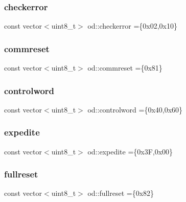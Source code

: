 \mbox{\label{namespaceod_ac4b980a10ae256ea019a767459b6ba9b}} 
\subsubsection{\texorpdfstring{checkerror}{checkerror}}
{\footnotesize\ttfamily const vector$<$uint8\+\_\+t$>$ od\+::checkerror =\{0x02,0x10\}}

\mbox{\label{namespaceod_a75b2ed7fb6e21d4335334e1525fd223c}} 
\subsubsection{\texorpdfstring{commreset}{commreset}}
{\footnotesize\ttfamily const vector$<$uint8\+\_\+t$>$ od\+::commreset =\{0x81\}}

\mbox{\label{namespaceod_acb23d3cf4cdb0ce0c85a884a5a97ac00}} 
\subsubsection{\texorpdfstring{controlword}{controlword}}
{\footnotesize\ttfamily const vector$<$uint8\+\_\+t$>$ od\+::controlword =\{0x40,0x60\}}

\mbox{\label{namespaceod_ae572be966c7d5de90544f2ac32dbbd38}} 
\subsubsection{\texorpdfstring{expedite}{expedite}}
{\footnotesize\ttfamily const vector$<$uint8\+\_\+t$>$ od\+::expedite =\{0x3\+F,0x00\}}

\mbox{\label{namespaceod_af9d6d0e820d6bc1ee375195e253f7b7b}} 
\subsubsection{\texorpdfstring{fullreset}{fullreset}}
{\footnotesize\ttfamily const vector$<$uint8\+\_\+t$>$ od\+::fullreset =\{0x82\}}

